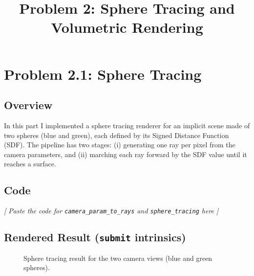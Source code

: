 \documentclass[11pt]{article}
\title{Problem 2: Sphere Tracing and Volumetric Rendering}
\author{}
\date{}
\begin{document}
\maketitle

\section{Problem 2.1: Sphere Tracing}

\subsection{Overview}
In this part I implemented a sphere tracing renderer for an implicit scene made of two
spheres (blue and green), each defined by its Signed Distance Function (SDF). The pipeline
has two stages: (i) generating one ray per pixel from the camera parameters, and (ii)
marching each ray forward by the SDF value until it reaches a surface.

\subsection{Code}



\vspace{1cm}
\textit{[ Paste the code for \texttt{camera\_param\_to\_rays} and \texttt{sphere\_tracing} here ]}
\vspace{1cm}

\subsection{Rendered Result (\texttt{submit} intrinsics)}
\begin{figure}[h]
    \centering
    \caption{Sphere tracing result for the two camera views (blue and green spheres).}
    \label{fig:sphere_tracing}
\end{figure}
\end{document}
